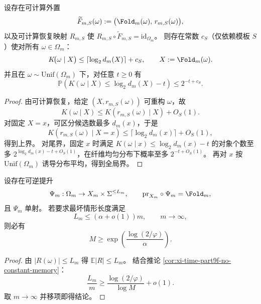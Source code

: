 \begin{theorem}[算法信息坍缩的纤维对数体积上界与指数尾]\label{thm:xi-time-part9f-kolmogorov-fiber-saturation}
设存在可计算外置
\[
\widetilde F_{m,S}(\omega):=
\bigl(\Fold_m(\omega),\,r_{m,S}(\omega)\bigr),
\]
以及可计算恢复映射 \(R_{m,S}\) 使
\(
R_{m,S}\circ \widetilde F_{m,S}=\mathrm{id}_{\Omega_m}
\)。
则存在常数 \(c_S\)（仅依赖模板 \(S\)）使对所有 \(\omega\in\Omega_m\)：
\[
K\!\bigl(\omega\mid X\bigr)
\le
\left\lceil\log_2 d_m(X)\right\rceil+c_S,
\qquad
X:=\Fold_m(\omega).
\]
并且在 \(\omega\sim\mathrm{Unif}(\Omega_m)\) 下，对任意 \(t\ge 0\) 有
\[
\mathbb P\!\left(
K(\omega\mid X)\le \log_2 d_m(X)-t
\right)
\le
2^{-t+c_S}.
\]
\end{theorem}
\begin{proof}
由可计算恢复，给定 \((X,r_{m,S}(\omega))\) 可重构 \(\omega\)，故
\[
K(\omega\mid X)\le K(r_{m,S}(\omega)\mid X)+O_S(1).
\]
对固定 \(X=x\)，可区分候选数最多 \(d_m(x)\)，于是
\[
K(r_{m,S}(\omega)\mid X=x)\le \lceil \log_2 d_m(x)\rceil+O_S(1),
\]
得到上界。
对尾界，固定 \(x\) 时满足
\(
K(\omega\mid x)\le \log_2 d_m(x)-t
\)
的对象个数至多 \(2^{\log_2 d_m(x)-t+O_S(1)}\)，在纤维均匀分布下概率至多 \(2^{-t+O_S(1)}\)。
再对 \(x\) 按 \(\mathrm{Unif}(\Omega_m)\) 诱导分布平均，得到全局界。
\end{proof}

\begin{proposition}[线性预算下的字母表指数阈值]\label{prop:xi-time-part9f-alphabet-threshold}
设存在可逆提升
\[
\Psi_m:\Omega_m\to X_m\times\Sigma^{\le L_m},
\qquad
\mathrm{pr}_{X_m}\circ\Psi_m=\Fold_m,
\]
且 \(\Psi_m\) 单射。
若要求最坏情形长度满足
\[
L_m\le (\alpha+o(1))m,\qquad m\to\infty,
\]
则必有
\[
M\ge \exp\!\left(\frac{\log(2/\varphi)}{\alpha}\right).
\]
\end{proposition}
\begin{proof}
由 \(|R(\omega)|\le L_m\) 得 \(\mathbb E|R|\le L_m\)。
结合推论 \ref{cor:xi-time-part9f-no-constant-memory}：
\[
\frac{L_m}{m}\ge \frac{\log(2/\varphi)}{\log M}+o(1).
\]
取 \(m\to\infty\) 并移项即得结论。
\end{proof}


